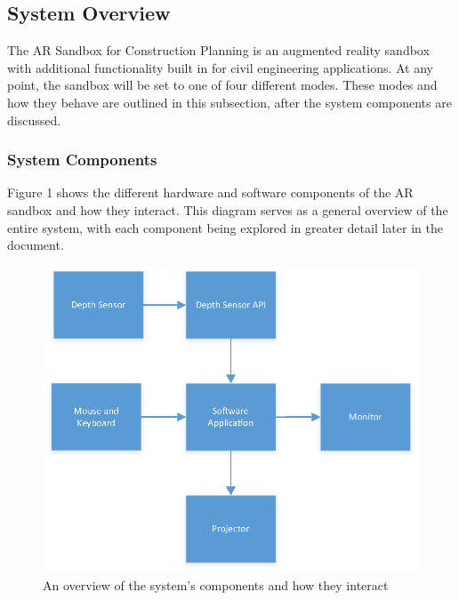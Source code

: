 \subsection{System Overview}


The AR Sandbox for Construction Planning is an augmented reality sandbox with additional functionality built in for civil engineering applications.
At any point, the sandbox will be set to one of four different modes.
These modes and how they behave are outlined in this subsection, after the system components are discussed.

\vfill

\subsubsection{System Components}
\par Figure 1 shows the different hardware and software components of the AR sandbox and how they interact. This diagram serves as a general overview of the entire system, with each component being explored in greater detail later in the document.

\begin{figure}[H] 
	\centering
	\includegraphics[width=6in]{BlockDiagram}
    \caption{An overview of the system's components and how they interact}
    \label{fig:overview}
\end{figure}

